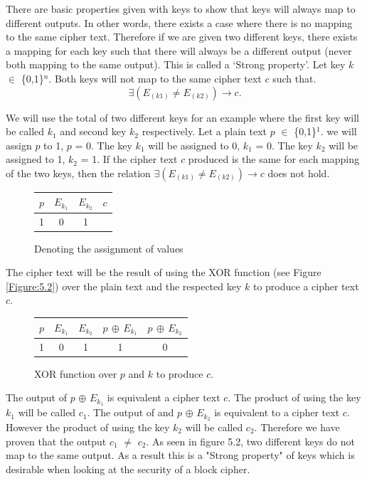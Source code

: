 \documentclass[11pt,a4paper, notitlepage]{report}
\begin{document}
There are basic properties given with keys to show that keys will always map to different outputs. In other words, there exists a case where there is no mapping to the same cipher text. Therefore if we are given two different keys, there exists a mapping for each key such that there will always be a different output (never both mapping to the same output). This is called a `Strong property'. Let key $k$ $\in$ \{0,1\}$^{n}$. Both keys will not map to the same cipher text $c$ such that. 
\begin{displaymath}
\exists (E_{(k1)} \neq E_{(k2)}) \rightarrow c.
\end{displaymath}

We will use the total of two different keys for an example where the first key will be called $k_{1}$ and second key $k_{2}$ respectively. Let a plain text $p$ $\in$ \{0,1\}$^{1}$. we will assign $p$ to 1, $p$ = 0. The key $k_{1}$ will be assigned to 0, $k_{1}$ = 0. The key $k_{2}$ will be assigned to 1, $k_{2}$ = 1. If the cipher text $c$ produced is the same for each mapping of the two keys, then the relation $\exists (E_{(k1)} \neq E_{(k2)}) \rightarrow c$ does not hold. 


\begin{figure}[H]
\centering
\label{tab:assignment of values}
\begin{tabular}{|c|c|c|c|}
\hline
$p$ & $E_{k_{1}}$ & $E_{k_{2}}$ & $c$ \\ \hline
1 & 0 & 1 & {}\\
\hline
\end{tabular}
\caption{Denoting the assignment of values}
\end{figure}  


The cipher text will be the result of using the XOR function (see Figure \ref{Figure:5.2}) over the plain text and the respected key $k$ to produce a cipher text $c$. 

\begin{figure}[H]
\centering
\label{tab:XOR function}
\begin{tabular}{|c|c|c|c|c|}
\hline
$p$ & $E_{k_{1}}$ & $E_{k_{2}}$ & $p$ $\oplus$ $E_{k_{1}}$ & $p$ $\oplus$ $E_{k_{2}}$\\ \hline
1 & 0 & 1 & 1 & 0 \\
\hline
\end{tabular}
\caption{XOR function over $p$ and $k$ to produce $c$.}
\end{figure}

The output of $p$ $\oplus$ $E_{k_{1}}$ is equivalent a cipher text $c$. The product of using the key $k_{1}$ will be called $c_{1}$. The output of and $p$ $\oplus$ $E_{k_{2}}$ is equivalent to a cipher text $c$. However the product of using the key $k_{2}$ will be called $c_{2}$. Therefore we have proven that the output $c_{1}$ $\neq$ $c_{2}$.
As seen in figure 5.2, two different keys do not map to the same output. As a result this is a "Strong property" of keys which is desirable when looking at the security of a block cipher.
\end{document}
